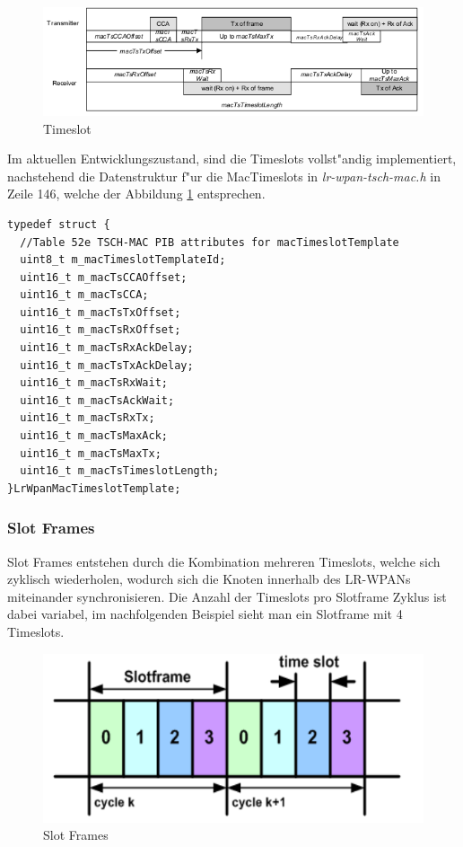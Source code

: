 \begin{figure}[h]
    \centering
    \includegraphics[scale=1.0]{images/timeslot.png}
    \caption{Timeslot \cite{IEEE802154e}}
    \label{fig:timeslot}
\end{figure}

Im aktuellen Entwicklungszustand, sind die Timeslots vollst"andig implementiert,
nachstehend die Datenstruktur f"ur die MacTimeslots in \textit{lr-wpan-tsch-mac.h}
in Zeile 146, welche der Abbildung \ref{fig:timeslot} entsprechen.
\begin{lstlisting}[frame=single]
typedef struct {
  //Table 52e TSCH-MAC PIB attributes for macTimeslotTemplate
  uint8_t m_macTimeslotTemplateId;
  uint16_t m_macTsCCAOffset;
  uint16_t m_macTsCCA;
  uint16_t m_macTsTxOffset;
  uint16_t m_macTsRxOffset;
  uint16_t m_macTsRxAckDelay;
  uint16_t m_macTsTxAckDelay;
  uint16_t m_macTsRxWait;
  uint16_t m_macTsAckWait;
  uint16_t m_macTsRxTx;
  uint16_t m_macTsMaxAck;
  uint16_t m_macTsMaxTx;
  uint16_t m_macTsTimeslotLength;
}LrWpanMacTimeslotTemplate;
\end{lstlisting}

\subsubsection{Slot Frames}
\label{sec:slotframes}

Slot Frames entstehen durch die Kombination mehreren Timeslots, welche sich
zyklisch wiederholen, wodurch sich die Knoten innerhalb des LR-WPANs miteinander
synchronisieren. Die Anzahl der Timeslots pro Slotframe Zyklus ist dabei variabel,
im nachfolgenden Beispiel sieht man ein Slotframe mit 4 Timeslots.

\begin{figure}[h]
    \centering
    \includegraphics[scale=0.7]{images/slotframes.png}
    \caption{Slot Frames \cite{slotframes_fig}}
    \label{fig:slotframes}
\end{figure}

